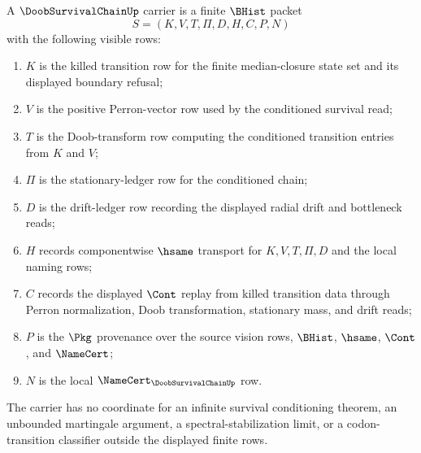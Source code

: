 \begin{definition}
\label{def:doob-survival-chain-carrier}
A $\DoobSurvivalChainUp$ carrier is a finite $\BHist$ packet
$$
S=(K,V,T,\Pi,D,H,C,P,N)
$$
with the following visible rows:
\begin{enumerate}
\item $K$ is the killed transition row for the finite median-closure state set and its displayed boundary refusal;
\item $V$ is the positive Perron-vector row used by the conditioned survival read;
\item $T$ is the Doob-transform row computing the conditioned transition entries from $K$ and $V$;
\item $\Pi$ is the stationary-ledger row for the conditioned chain;
\item $D$ is the drift-ledger row recording the displayed radial drift and bottleneck reads;
\item $H$ records componentwise $\hsame$ transport for $K,V,T,\Pi,D$ and the local naming rows;
\item $C$ records the displayed $\Cont$ replay from killed transition data through Perron normalization, Doob transformation, stationary mass, and drift reads;
\item $P$ is the $\Pkg$ provenance over the source vision rows, $\BHist$, $\hsame$, $\Cont$, and $\NameCert$;
\item $N$ is the local $\NameCert_{\DoobSurvivalChainUp}$ row.
\end{enumerate}
The carrier has no coordinate for an infinite survival conditioning theorem, an unbounded martingale argument, a spectral-stabilization limit, or a codon-transition classifier outside the displayed finite rows.
\end{definition}

